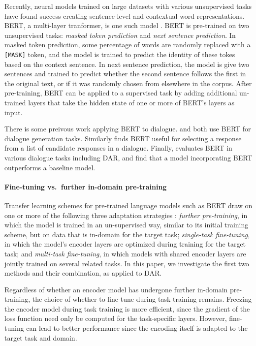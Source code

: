 \documentclass[11pt,a4paper]{article}
\begin{document}
Recently, neural models trained on large datasets with various unsupervised tasks have found success creating sentence-level and contextual word representations. 
BERT, a multi-layer tranformer, is one such model \citep{devlinBERTPretrainingDeep2018} . 
BERT is pre-trained on two unsupervised tasks: \emph{masked token prediction} and \emph{next sentence prediction}.
In masked token prediction, some percentage of words are randomly replaced with a \texttt{[MASK]} token, and the model is trained to predict the identity of these tokes based on the context sentence.
In next sentence prediction, the model is give two sentences and trained to predict whether the second sentence follows the first in the original text, or if it was randomly chosen from elsewhere in the corpus.
After pre-training, BERT can be applied to a supervised task by adding additional un-trained layers that take the hidden state of one or more of BERT's layers as input. 

There is some preivous work applying BERT to dialogue.
\citet{baoPLATOPretrainedDialogue2019,chenSemanticallyConditionedDialog2019a} and both use BERT for dialogue generation tasks.
Similarly \citet{vigComparisonTransferLearningApproaches2019} finds BERT useful for selecting a response from a list of candidate responses in a dialogue.
Finally, \citet{mehriPretrainingMethodsDialog2019} evaluates BERT in various dialogue tasks including DAR, and find that a model incorporating BERT outperforms a baseline model.

\paragraph{Fine-tuning vs.~further in-domain pre-training}
Transfer learning schemes for pre-trained language models such as BERT draw on one or more of the following three adaptation strategies \citet{sunHowFineTuneBERT2019}:
\emph{further pre-training}, in which the model is trained in an un-supervised way, similar to its initial training scheme, but on data that is in-domain for the target task; 
\emph{single-task fine-tuning}, in which the model's encoder layers are optimized during training for the target task;
and \emph{multi-task fine-tuning}, in which models with shared encoder layers are jointly trained on several related tasks.
In this paper, we investigate the first two methods and their combination, as applied to DAR.

Regardless of whether an encoder model has undergone further in-domain pre-training, the choice of whether to fine-tune during task training remains.
Freezing the encoder model during task training is more efficient, since the gradient of the loss function need only be computed for the task-specific layers.
However, fine-tuning can lead to better performance since the encoding itself is adapted to the target task and domain.
\end{document}

